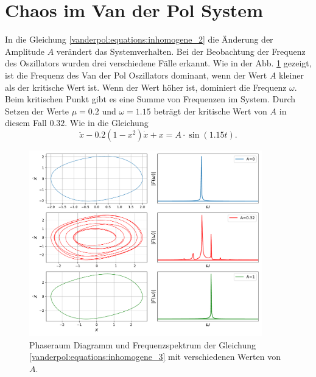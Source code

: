 \section{Chaos im Van der Pol System\label{vanderpol:section:chaos}}

In die Gleichung \ref{vanderpol:equations:inhomogene_2} die Änderung der Amplitude $A$ verändert das Systemverhalten. Bei der Beobachtung der Frequenz des Oszillators wurden drei verschiedene Fälle erkannt. Wie in der Abb. \ref{vanderpol:figures:fft} gezeigt, ist die Frequenz des Van der Pol Oszillators dominant, wenn der Wert $A$ kleiner als der kritische Wert ist. Wenn der Wert höher ist, dominiert die Frequenz $\omega$. Beim kritischen Punkt gibt es eine Summe von Frequenzen im System. Durch Setzen der Werte $\mu=0.2$ und $\omega=1.15$ beträgt der kritische Wert von $A$ in diesem Fall $0.32$. Wie in die Gleichung
\begin{equation}
	\ddot{x}-0.2\left(1-x^{2}\right) \dot{x}+x = A \cdot \sin(1.15 t).
	\label{vanderpol:equations:inhomogene_3}
\end{equation}

\begin{figure}
	\centering
	\includegraphics[width=0.9\textwidth]{papers/vanderpol/figures/fft_plot2.pdf}
	\caption{Phaseraum Diagramm und Frequenzspektrum der Gleichung \ref{vanderpol:equations:inhomogene_3} mit verschiedenen Werten von $A$.\label{vanderpol:figures:fft}}
\end{figure}

